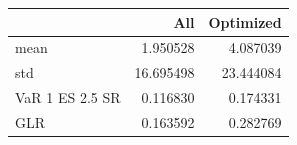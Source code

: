 \begin{tabular}{lrr}
\toprule
 & All & Optimized \\
\midrule
mean & 1.950528 & 4.087039 \\
std & 16.695498 & 23.444084 \\
VaR 1%
ES 2.5%
SR & 0.116830 & 0.174331 \\
GLR & 0.163592 & 0.282769 \\
\bottomrule
\end{tabular}
